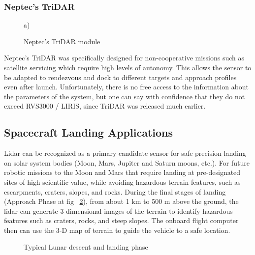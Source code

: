 \subsubsection{Neptec's TriDAR}
\begin{minipage}[h]{0.40\linewidth}
\begin{figure}[H]
 a) \\
\caption{Neptec's TriDAR module}
\label{fig:cubesat}
\end{figure}
\end{minipage}
\hfill
\begin{minipage}[h]{0.48\linewidth}
Neptec’s TriDAR was specifically designed for non-cooperative missions such as satellite servicing which require high levels of autonomy.
This allows the sensor to be adapted to rendezvous and dock to different targets and approach profiles even after launch.
Unfortunately, there is no free access to the information about the parameters of the system, but one can say with confidence that they do not exceed RVS3000 / LIRIS, since TriDAR was released much earlier.
\end{minipage}
\vspace{1cm}
\subsection{Spacecraft Landing Applications}
Lidar can be recognized as a primary candidate sensor for safe precision landing on solar system bodies (Moon, Mars, Jupiter and Saturn moons, etc.).
For future robotic missions to the Moon and Mars that require
landing at pre-designated sites of high scientific value, while avoiding hazardous terrain features, such as escarpments, craters, slopes, and rocks.
During the final stages of landing (Approach Phase at fig ~\ref{fig:landing}), from about 1 km to 500 m above the ground, the 
lidar can generate 3-dimensional images of the terrain to identify hazardous features such as craters, rocks, and steep slopes. The onboard flight computer then can use the 3-D map of terrain to guide the vehicle to a safe location.

\begin{figure}[h]
  \caption{Typical Lunar descent and landing phase}%
\label{fig:landing} %
\end{figure}

